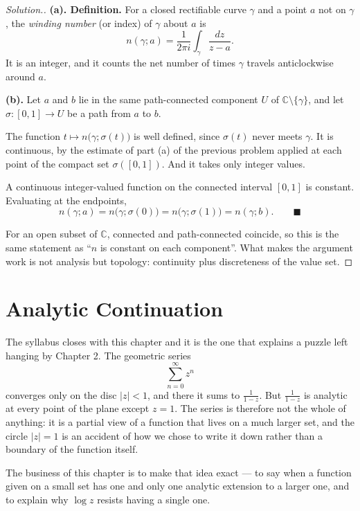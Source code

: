 \documentclass[11pt,a4paper]{article}
\theoremstyle{definition}
\newenvironment{solution}
  {\renewcommand{\qedsymbol}{}\begin{proof}[\textit{Solution}.]}
  {\end{proof}}
\begin{document}
\begin{solution}
\textbf{(a). Definition.} For a closed rectifiable curve $\gamma$ and a point $a$
not on $\gamma$, the \emph{winding number} (or index) of $\gamma$ about $a$ is
$$n(\gamma; a) = \frac{1}{2\pi i}\int_{\gamma}\frac{dz}{z-a} .$$
It is an integer, and it counts the net number of times $\gamma$ travels
anticlockwise around $a$.

\textbf{(b).} Let $a$ and $b$ lie in the same path-connected component $U$ of
$\mathbb{C}\setminus\{\gamma\}$, and let $\sigma : [0,1] \rightarrow U$ be a path
from $a$ to $b$.

The function $t \mapsto n\big(\gamma; \sigma(t)\big)$ is well defined, since
$\sigma(t)$ never meets $\gamma$. It is continuous, by the estimate of part (a) of
the previous problem applied at each point of the compact set $\sigma([0,1])$. And
it takes only integer values.

A continuous integer-valued function on the connected interval $[0,1]$ is
constant. Evaluating at the endpoints,
$$n(\gamma; a) = n\big(\gamma;\sigma(0)\big) = n\big(\gamma;\sigma(1)\big)
= n(\gamma; b). \qquad \blacksquare$$

For an open subset of $\mathbb{C}$, connected and path-connected coincide, so this
is the same statement as ``$n$ is constant on each component''. What makes the
argument work is not analysis but topology: continuity plus discreteness of the
value set.
\end{solution}

\pagebreak
{\color[wave]{485}\section{Analytic Continuation}}

The syllabus closes with this chapter and it is the one that explains a puzzle
left hanging by Chapter 2. The geometric series
$$\sum^{\infty}_{n = 0} z^n$$
converges only on the disc $\left|z\right| < 1$, and there it sums to
$\frac{1}{1 - z}$. But $\frac{1}{1 - z}$ is analytic at every point of the
plane except $z = 1$. The series is therefore not the whole of anything: it is a
partial view of a function that lives on a much larger set, and the circle
$\left|z\right| = 1$ is an accident of how we chose to write it down rather than
a boundary of the function itself.

The business of this chapter is to make that idea exact --- to say when a
function given on a small set has one and only one analytic extension to a
larger one, and to explain why $\log z$ resists having a single one.
\end{document}
